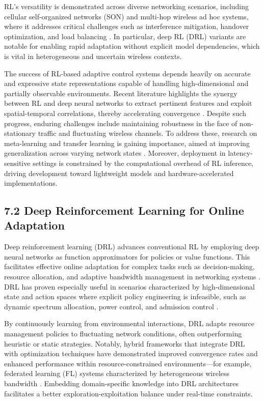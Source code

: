 \documentclass[11pt]{article}
\begin{document}
\begin{itemize}
RL's versatility is demonstrated across diverse networking scenarios, including cellular self-organized networks (SON) and multi-hop wireless ad hoc systems, where it addresses critical challenges such as interference mitigation, handover optimization, and load balancing \cite{ref31, ref32, ref33, ref34, ref35}. In particular, deep RL (DRL) variants are notable for enabling rapid adaptation without explicit model dependencies, which is vital in heterogeneous and uncertain wireless contexts.

The success of RL-based adaptive control systems depends heavily on accurate and expressive state representations capable of handling high-dimensional and partially observable environments. Recent literature highlights the synergy between RL and deep neural networks to extract pertinent features and exploit spatial-temporal correlations, thereby accelerating convergence \cite{ref31, ref32, ref33}. Despite such progress, enduring challenges include maintaining robustness in the face of non-stationary traffic and fluctuating wireless channels. To address these, research on meta-learning and transfer learning is gaining importance, aimed at improving generalization across varying network states \cite{ref35}. Moreover, deployment in latency-sensitive settings is constrained by the computational overhead of RL inference, driving development toward lightweight models and hardware-accelerated implementations.

\subsection{7.2 Deep Reinforcement Learning for Online Adaptation}

Deep reinforcement learning (DRL) advances conventional RL by employing deep neural networks as function approximators for policies or value functions. This facilitates effective online adaptation for complex tasks such as decision-making, resource allocation, and adaptive bandwidth management in networking systems \cite{ref4, ref8, ref13, ref15, ref50}. DRL has proven especially useful in scenarios characterized by high-dimensional state and action spaces where explicit policy engineering is infeasible, such as dynamic spectrum allocation, power control, and admission control \cite{ref4, ref8}.

By continuously learning from environmental interactions, DRL adapts resource management policies to fluctuating network conditions, often outperforming heuristic or static strategies. Notably, hybrid frameworks that integrate DRL with optimization techniques have demonstrated improved convergence rates and enhanced performance within resource-constrained environments—for example, federated learning (FL) systems characterized by heterogeneous wireless bandwidth \cite{ref50}. Embedding domain-specific knowledge into DRL architectures facilitates a better exploration-exploitation balance under real-time constraints.


\end{itemize}
\end{document}

